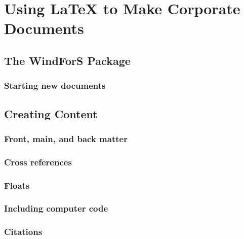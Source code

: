 \section{Using LaTeX to Make Corporate Documents }


\subsection{The WindForS Package}\label{sec:Corporatecls}


\subsubsection{Starting new documents}\label{sec:NewDocs}


\subsection{Creating Content}
\subsubsection{Front, main, and back matter}


\subsubsection{Cross references}


\subsubsection{Floats}


\subsubsection{Including computer code}\label{Sec:Codes}


\subsubsection{Citations}\label{Sec:Citations}


